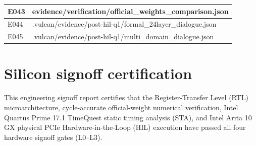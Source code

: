 \documentclass[11pt,a4paper]{article}
\begin{document}
{\begin{longtable}{@{}L{0.12\textwidth}|L{0.82\textwidth}@{}}
E043 & evidence/\allowbreak{}verification/\allowbreak{}official\_\allowbreak{}weights\_\allowbreak{}comparison.json\\[2pt]\hline

E044 & .vulcan/\allowbreak{}evidence/\allowbreak{}post-hil-q1/\allowbreak{}formal\_\allowbreak{}24layer\_\allowbreak{}dialogue.json\\[2pt]\hline

E045 & .vulcan/\allowbreak{}evidence/\allowbreak{}post-hil-q1/\allowbreak{}multi\_\allowbreak{}domain\_\allowbreak{}dialogue.json\\[2pt]\hline

\bottomrule\end{longtable}}

\section{Silicon signoff certification}

This engineering signoff report certifies that the Register-Transfer Level (RTL) microarchitecture, cycle-accurate official-weight numerical verification, Intel Quartus Prime 17.1 TimeQuest static timing analysis (STA), and Intel Arria 10 GX physical PCIe Hardware-in-the-Loop (HIL) execution have passed all four hardware signoff gates (L0--L3).
\end{document}
